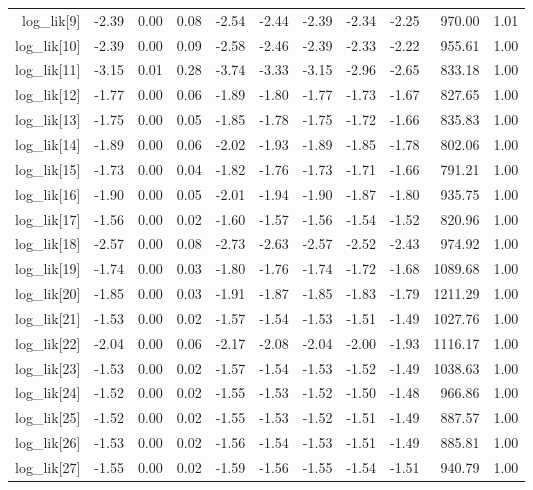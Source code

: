 \begin{table}[ht]
\begin{tabular}{rrrrrrrrrrr}
  log\_lik[9] & -2.39 & 0.00 & 0.08 & -2.54 & -2.44 & -2.39 & -2.34 & -2.25 & 970.00 & 1.01 \\ 
  log\_lik[10] & -2.39 & 0.00 & 0.09 & -2.58 & -2.46 & -2.39 & -2.33 & -2.22 & 955.61 & 1.00 \\ 
  log\_lik[11] & -3.15 & 0.01 & 0.28 & -3.74 & -3.33 & -3.15 & -2.96 & -2.65 & 833.18 & 1.00 \\ 
  log\_lik[12] & -1.77 & 0.00 & 0.06 & -1.89 & -1.80 & -1.77 & -1.73 & -1.67 & 827.65 & 1.00 \\ 
  log\_lik[13] & -1.75 & 0.00 & 0.05 & -1.85 & -1.78 & -1.75 & -1.72 & -1.66 & 835.83 & 1.00 \\ 
  log\_lik[14] & -1.89 & 0.00 & 0.06 & -2.02 & -1.93 & -1.89 & -1.85 & -1.78 & 802.06 & 1.00 \\ 
  log\_lik[15] & -1.73 & 0.00 & 0.04 & -1.82 & -1.76 & -1.73 & -1.71 & -1.66 & 791.21 & 1.00 \\ 
  log\_lik[16] & -1.90 & 0.00 & 0.05 & -2.01 & -1.94 & -1.90 & -1.87 & -1.80 & 935.75 & 1.00 \\ 
  log\_lik[17] & -1.56 & 0.00 & 0.02 & -1.60 & -1.57 & -1.56 & -1.54 & -1.52 & 820.96 & 1.00 \\ 
  log\_lik[18] & -2.57 & 0.00 & 0.08 & -2.73 & -2.63 & -2.57 & -2.52 & -2.43 & 974.92 & 1.00 \\ 
  log\_lik[19] & -1.74 & 0.00 & 0.03 & -1.80 & -1.76 & -1.74 & -1.72 & -1.68 & 1089.68 & 1.00 \\ 
  log\_lik[20] & -1.85 & 0.00 & 0.03 & -1.91 & -1.87 & -1.85 & -1.83 & -1.79 & 1211.29 & 1.00 \\ 
  log\_lik[21] & -1.53 & 0.00 & 0.02 & -1.57 & -1.54 & -1.53 & -1.51 & -1.49 & 1027.76 & 1.00 \\ 
  log\_lik[22] & -2.04 & 0.00 & 0.06 & -2.17 & -2.08 & -2.04 & -2.00 & -1.93 & 1116.17 & 1.00 \\ 
  log\_lik[23] & -1.53 & 0.00 & 0.02 & -1.57 & -1.54 & -1.53 & -1.52 & -1.49 & 1038.63 & 1.00 \\ 
  log\_lik[24] & -1.52 & 0.00 & 0.02 & -1.55 & -1.53 & -1.52 & -1.50 & -1.48 & 966.86 & 1.00 \\ 
  log\_lik[25] & -1.52 & 0.00 & 0.02 & -1.55 & -1.53 & -1.52 & -1.51 & -1.49 & 887.57 & 1.00 \\ 
  log\_lik[26] & -1.53 & 0.00 & 0.02 & -1.56 & -1.54 & -1.53 & -1.51 & -1.49 & 885.81 & 1.00 \\ 
  log\_lik[27] & -1.55 & 0.00 & 0.02 & -1.59 & -1.56 & -1.55 & -1.54 & -1.51 & 940.79 & 1.00 \\ 

\end{tabular}
\end{table}
